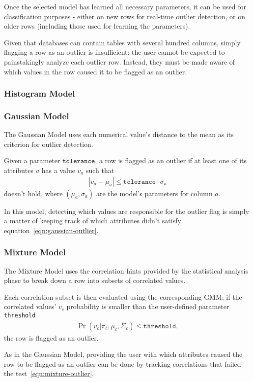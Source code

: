 Once the selected model has learned all necessary parameters, it can be used for classification purposes - either on new rows for real-time outlier detection, or on older rows (including those used for learning the parameters).

Given that databases can contain tables with several hundred columns, simply flagging a row as an outlier is insufficient: the user cannot be expected to painstakingly analyze each outlier row. Instead, they must be made aware of which values in the row caused it to be flagged as an outlier.

\subsubsection{Histogram Model}
\subsubsection{Gaussian Model}
The Gaussian Model uses each numerical value's distance to the mean as its criterion for outlier detection. 

Given a parameter $\texttt{tolerance}$, a row is flagged as an outlier if at least one of its attributes $a$ has a value $v_a$ such that 
\begin{align}
|v_a - \mu_a| \leq \texttt{tolerance} \cdot \sigma_a
\label{eqn:gaussian-outlier}
\end{align}
doesn't hold, where $(\mu_a, \sigma_a)$ are the model's parameters for column $a$.

In this model, detecting which values are responsible for the outlier flag is simply a matter of keeping track of which attributes didn't satisfy equation~\ref{eqn:gaussian-outlier}.
 
\subsubsection{Mixture Model}
The Mixture Model uses the correlation hints provided by the statistical analysis phase to break down a row into subsets of correlated values.

Each correlation subset is then evaluated using the corresponding GMM; if the correlated values' $v_c$ probability is smaller than the user-defined parameter \texttt{threshold}
\begin{align}
\Pr(v_c | \pi_c, \mu_c, \Sigma_c) \leq \texttt{threshold}, 
\label{eqn:mixture-outlier}
\end{align}
the row is flagged as an outlier.

As in the Gaussian Model, providing the user with which attributes caused the row to be flagged as an outlier can be done by tracking correlations that failed the test~\ref{eqn:mixture-outlier}.